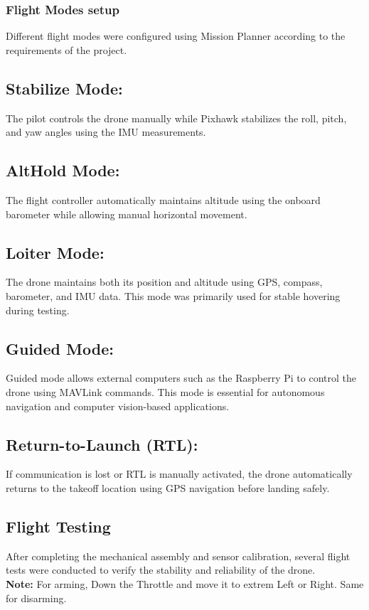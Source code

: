\documentclass[12pt]{article}
\begin{document}
{\subsubsection{Flight Modes setup}
Different flight modes were configured using Mission Planner according to the requirements of the project.
\subsection*{Stabilize Mode:}The pilot controls the drone manually while Pixhawk stabilizes the roll, pitch, and yaw angles using the IMU measurements.
\subsection*{AltHold Mode:}The flight controller automatically maintains altitude using the onboard barometer while allowing manual horizontal movement.
\subsection*{Loiter Mode:}The drone maintains both its position and altitude using GPS, compass, barometer, and IMU data. This mode was primarily used for stable hovering during testing.
\subsection*{Guided Mode:}Guided mode allows external computers such as the Raspberry Pi to control the drone using MAVLink commands. This mode is essential for autonomous navigation and computer vision-based applications.
\subsection*{Return-to-Launch (RTL):}If communication is lost or RTL is manually activated, the drone automatically returns to the takeoff location using GPS navigation before landing safely.
\newpage
\subsection{Flight Testing}
After completing the mechanical assembly and sensor calibration, several flight tests were conducted to verify the stability and reliability of the drone.\\
\Large{\textbf{Note: }}For arming, Down the Throttle and move it to extrem Left or Right. Same for disarming.
}
\end{document}
